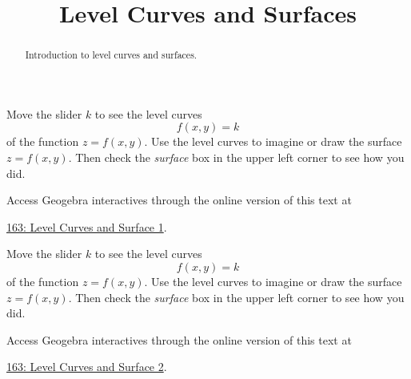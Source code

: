 \documentclass{ximera}
\title{Level Curves and Surfaces}
\begin{document}
\begin{abstract}
Introduction to level curves and surfaces.
\end{abstract}
\maketitle



\begin{example}  \label{Edfhpgdf45}
Move the slider $k$ to see the level curves 
\[
    f(x,y)=k
\]
of the function $z=f(x,y)$. Use the level curves to imagine or draw the surface $z=f(x,y)$. Then check the \emph{surface} box in the upper left corner to see how you did. 


 
\begin{onlineOnly}
    \begin{center}
\end{center}
\end{onlineOnly}

Access Geogebra interactives through the online version of this text at
 
\href{https://www.geogebra.org/classic/nk4ap6kj}{163: Level Curves and Surface 1}.
\end{example}



\begin{example}  \label{Edfhpgdf45}
Move the slider $k$ to see the level curves 
\[
    f(x,y)=k
\]
of the function $z=f(x,y)$. Use the level curves to imagine or draw the surface $z=f(x,y)$. Then check the \emph{surface} box in the upper left corner to see how you did. 


 
\begin{onlineOnly}
    \begin{center}
\end{center}
\end{onlineOnly}

Access Geogebra interactives through the online version of this text at
 
\href{https://www.geogebra.org/classic/vk7zt92m}{163: Level Curves and Surface 2}.
\end{example}
\end{document}
